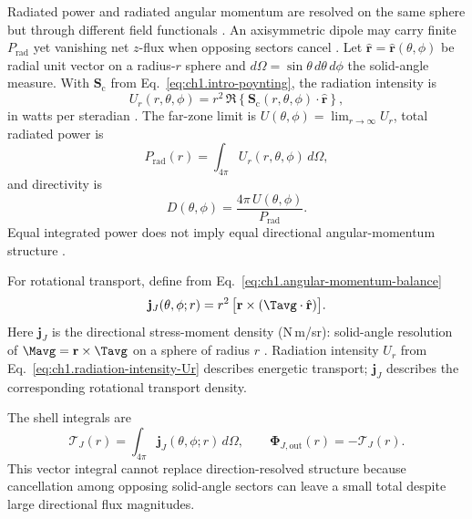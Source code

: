 Radiated power and radiated angular momentum are resolved on the same sphere but through different field functionals \cite{stratton1941,beth1936}. An axisymmetric dipole may carry finite $P_{\mathrm{rad}}$ yet vanishing net $z$-flux when opposing sectors cancel \cite{stratton1941}. Let \(\hat{\mathbf{r}}=\hat{\mathbf{r}}(\theta,\phi)\) be radial unit vector on a
radius-\(r\) sphere and \(d\Omega=\sin\theta\,d\theta\,d\phi\) the solid-angle
measure. With \(\mathbf{S}_\mathrm{c}\) from Eq.~\eqref{eq:ch1.intro-poynting}, the radiation intensity is
\begin{equation}
\label{eq:ch1.radiation-intensity-Ur}
U_r(r,\theta,\phi)=
r^2\,\Re\!\left\{\mathbf{S}_\mathrm{c}(r,\theta,\phi)\cdot\hat{\mathbf{r}}\right\},
\end{equation}
in watts per steradian \cite{poynting1884,harrington2001}. The far-zone limit is $U(\theta,\phi)=\lim_{r\to\infty}U_r$, total radiated power is
\begin{equation}
\label{eq:ch1.directional-power-integral}
P_{\mathrm{rad}}(r)=\int_{4\pi}U_r(r,\theta,\phi)\,d\Omega,
\end{equation}
and directivity is
\begin{equation}
\label{eq:ch1.directivity-definition}
D(\theta,\phi)=\frac{4\pi\,U(\theta,\phi)}{P_{\mathrm{rad}}}.
\end{equation}
Equal integrated power does not imply equal directional angular-momentum structure \cite{stratton1941}.

For rotational transport, define from
Eq.~\eqref{eq:ch1.angular-momentum-balance}
\begin{equation}
\label{eq:ch1.directional-am-flux}
\mathbf{j}_J(\theta,\phi;r)=
r^2\,\big[\mathbf{r}\times(\Tavg\cdot\hat{\mathbf{r}})\big].
\end{equation}
Here $\mathbf{j}_J$ is the directional stress-moment density (N\,m/sr): solid-angle resolution of $\Mavg=\mathbf{r}\times\Tavg$ on a sphere of radius $r$ \cite{beth1936,stratton1941}. Radiation intensity $U_r$ from Eq.~\eqref{eq:ch1.radiation-intensity-Ur} describes energetic transport; $\mathbf{j}_J$ describes the corresponding rotational transport density.

The shell integrals are
\begin{equation}
\label{eq:ch1.directional-am-total}
\boldsymbol{\mathcal{T}}_J(r)=
\int_{4\pi}\mathbf{j}_J(\theta,\phi;r)\,d\Omega,
\qquad
\boldsymbol{\Phi}_{J,\mathrm{out}}(r)=-\boldsymbol{\mathcal{T}}_J(r).
\end{equation}
This vector integral cannot replace direction-resolved structure because cancellation among
opposing solid-angle sectors can leave a small total despite large directional flux
magnitudes.

